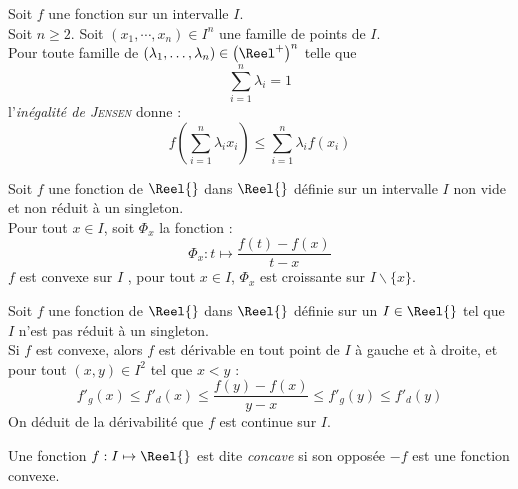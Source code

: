 \documentclass[11pt,a4paper,fleqn,pdftex]{report}
\begin{document}
\begin{itheorem}
     Soit $f$ une fonction  sur un intervalle $I$. \\
     Soit $n\ge 2$. Soit $(x_1,\cdots ,x_n) \in I^n$ une famille de points de $I$. \\
     Pour toute famille de  $(\lambda_1,\ldots ,\lambda_n)\in {\left( \Reel^+ \right) }^n$ telle que \[
         \sum_{i=1}^n \lambda_i = 1
     \]
     l'\emph{inégalité de \textsc{Jensen}} donne :
     \begin{equation}
     f \left( \sum_{i=1}^n \lambda_i x_i \right) \le \sum_{i=1}^n \lambda_i f(x_i)
     \end{equation}
\end{itheorem}
\begin{theorem}
     Soit $f$ une fonction de $\Reel{}$ dans $\Reel{}$ définie sur un intervalle $I$ non vide et non réduit à un singleton.\\
     Pour tout $x\in I$, soit $\Phi_x$ la fonction :
     \begin{equation}
      \Phi_x : t\mapsto \dfrac{f(t) - f(x)}{t-x}
     \end{equation} 
     $f$ est convexe sur $I$ \ssi{}, pour tout $x\in I$, $\Phi_x$ est croissante sur $I\backslash \{x\}$.
\end{theorem}
\begin{itheorem}
\label{thm:inegalite_des_pentes}
     Soit $f$ une fonction de $\Reel{}$ dans $\Reel{}$ définie sur un  $I\in \Reel{}$ tel que $I$ n'est pas réduit à un singleton. \\
     Si $f$ est convexe, alors $f$ est dérivable en tout point de $I$ à gauche et à droite, et pour tout $(x,y) \in I^2$ tel que $x<y$ :
     \begin{equation}
     f'_g(x) \le f'_d(x) \le \dfrac{f(y) - f(x)}{y - x} \le f'_g(y) \le f'_d(y)
     \end{equation}
      On déduit de la dérivabilité que $f$ est continue sur $I$.
\end{itheorem}
\begin{dfn}
    \begin{minipage}{0.4\textwidth}
    Une fonction $f : I \mapsto \Reel{}$ est dite \emph{concave} si son opposée $-f$ est une fonction convexe. 
    \end{minipage}\hspace{0.2\textwidth}
    \begin{minipage}{0.4\textwidth}
    \begin{center}
    \end{center}
    \end{minipage}
\end{dfn}
\end{document}
